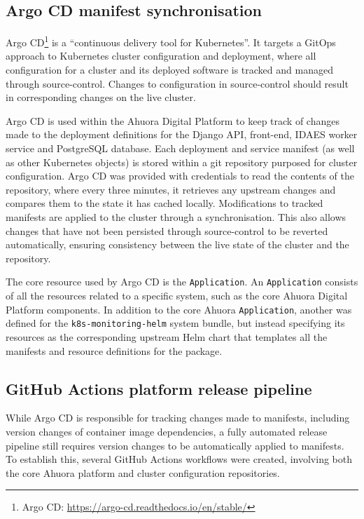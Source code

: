 \subsection{Argo CD manifest synchronisation}

Argo CD\footnote{Argo CD: \url{https://argo-cd.readthedocs.io/en/stable/}} is a ``continuous delivery tool for Kubernetes''. It targets a GitOps approach to Kubernetes cluster configuration and deployment, where all configuration for a cluster and its deployed software is tracked and managed through source-control. Changes to configuration in source-control should result in corresponding changes on the live cluster.

Argo CD is used within the Ahuora Digital Platform to keep track of changes made to the deployment definitions for the Django API, front-end, IDAES worker service and PostgreSQL database. Each deployment and service manifest (as well as other Kubernetes objects) is stored within a git repository purposed for cluster configuration. Argo CD was provided with credentials to read the contents of the repository, where every three minutes, it retrieves any upstream changes and compares them to the state it has cached locally. Modifications to tracked manifests are applied to the cluster through a synchronisation. This also allows changes that have not been persisted through source-control to be reverted automatically, ensuring consistency between the live state of the cluster and the repository.

The core resource used by Argo CD is the \verb|Application|. An \verb|Application| consists of all the resources related to a specific system, such as the core Ahuora Digital Platform components. In addition to the core Ahuora \verb|Application|, another was defined for the \verb|k8s-monitoring-helm| system bundle, but instead specifying its resources as the corresponding upstream Helm chart that templates all the manifests and resource definitions for the package.

\subsection{GitHub Actions platform release pipeline}

While Argo CD is responsible for tracking changes made to manifests, including version changes of container image dependencies, a fully automated release pipeline still requires version changes to be automatically applied to manifests. To establish this, several GitHub Actions workflows were created, involving both the core Ahuora platform and cluster configuration repositories.

